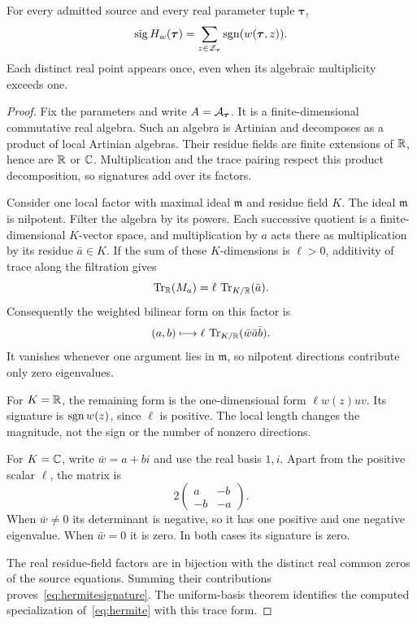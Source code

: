 \begin{theorem}\label{thm:hermite}
For every admitted source and every real parameter tuple $\bm\tau$,
\begin{equation}\label{eq:hermitesignature}
\operatorname{sig} H_w(\bm\tau)=\sum_{z\in\mathcal Z_{\bm\tau}}\operatorname{sgn}(w(\bm\tau,z)).
\end{equation}
Each distinct real point appears once, even when its algebraic multiplicity exceeds one.
\end{theorem}
\begin{proof}
Fix the parameters and write $A=\mathcal A_{\bm\tau}$. It is a finite-dimensional commutative real algebra. Such an algebra is Artinian and decomposes as a product of local Artinian algebras. Their residue fields are finite extensions of $\mathbb R$, hence are $\mathbb R$ or $\mathbb C$. Multiplication and the trace pairing respect this product decomposition, so signatures add over its factors.

Consider one local factor with maximal ideal $\mathfrak m$ and residue field $K$. The ideal $\mathfrak m$ is nilpotent. Filter the algebra by its powers. Each successive quotient is a finite-dimensional $K$-vector space, and multiplication by $a$ acts there as multiplication by its residue $\bar a\in K$. If the sum of these $K$-dimensions is $\ell>0$, additivity of trace along the filtration gives
\[
\operatorname{Tr}_{\mathbb R}(M_a)=\ell\,\operatorname{Tr}_{K/\mathbb R}(\bar a).
\]
Consequently the weighted bilinear form on this factor is
\[
(a,b)\longmapsto \ell\,\operatorname{Tr}_{K/\mathbb R}(\bar w\bar a\bar b).
\]
It vanishes whenever one argument lies in $\mathfrak m$, so nilpotent directions contribute only zero eigenvalues.

For $K=\mathbb R$, the remaining form is the one-dimensional form $\ell w(z)uv$. Its signature is $\operatorname{sgn} w(z)$, since $\ell$ is positive. The local length changes the magnitude, not the sign or the number of nonzero directions.

For $K=\mathbb C$, write $\bar w=a+bi$ and use the real basis $1,i$. Apart from the positive scalar $\ell$, the matrix is
\[
2\begin{pmatrix}a&-b\\-b&-a\end{pmatrix}.
\]
When $\bar w\ne0$ its determinant is negative, so it has one positive and one negative eigenvalue. When $\bar w=0$ it is zero. In both cases its signature is zero.

The real residue-field factors are in bijection with the distinct real common zeros of the source equations. Summing their contributions proves~\eqref{eq:hermitesignature}. The uniform-basis theorem identifies the computed specialization of~\eqref{eq:hermite} with this trace form.
\end{proof}

